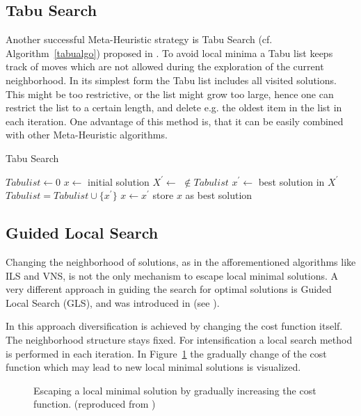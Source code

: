 \subsection{Tabu Search}
Another successful Meta-Heuristic strategy is Tabu Search (cf. Algorithm~\ref{tabualgo}) proposed in \cite{glover1999tabu}. 
To avoid local minima a Tabu list keeps track of moves which are not allowed during the exploration of the current neighborhood. 
In its simplest form the Tabu list includes all visited solutions. 
This might be too restrictive, or the list might grow too large, hence one can restrict the list to a certain length, and delete e.g. the oldest item in the list in each iteration. 
One advantage of this method is, that it can be easily combined with other Meta-Heuristic algorithms.

\begin{algorithm}
\caption{Tabu Search}
\label{tabualgo}
\begin{algorithmic}[1]
\State $Tabulist \gets 0$
\State $x\gets$ initial solution
\Repeat
 \State $X^\prime \gets$  $\not\in Tabulist$
 \State $x^\prime \gets$ best solution in $X^\prime$
 \State $Tabulist = Tabulist \cup \{x^\prime\}$
 \State $x \gets x^\prime$
   \State store $x$ as best solution
 \EndIf
{}
\end{algorithmic}
\end{algorithm}

\subsection{Guided Local Search}
Changing the neighborhood of solutions, as in the afforementioned algorithms like ILS and VNS, is not the only mechanism to escape local minimal solutions.
A very different approach in guiding the search for optimal solutions is Guided Local Search (GLS), and was introduced in (see \cite{TsangVoudouris1997gls}\cite{TsangVoudouris1999gls}). 

In this approach diversification is achieved by changing the cost function itself. 
The neighborhood structure stays fixed. 
For intensification a local search method is performed in each iteration.
In Figure~\ref{fig:fig_gls} the gradually change of the cost function which may lead to new local minimal solutions is visualized. 
\begin{figure}[thb] 
   \footnotesize
   \centering
    \def\svgwidth{0.75\textwidth}
    
    \caption[Escaping a local minimal solution by gradually increasing the cost function.]{Escaping a local minimal solution by gradually increasing the cost function. (reproduced from \cite{blum2003metaheuristics})}  
     \label{fig:fig_gls}
\end{figure}

